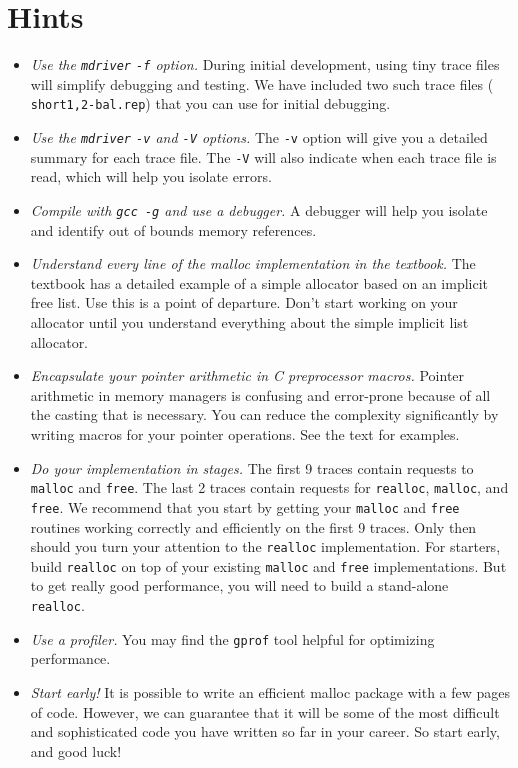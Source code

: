 \documentclass[11pt]{article}
\begin{document}
\section{Hints}
\begin{itemize}

\item {\em Use the {\tt mdriver} {\tt -f} option.}  During initial
development, using tiny trace files will simplify debugging and
testing. We have included two such trace files ({\tt
short{1,2}-bal.rep}) that you can use for initial debugging.

\item {\em Use the {\tt mdriver} {\tt -v} and {\tt -V} options.}  The
{\tt -v} option will give you a detailed summary for each trace file.
The {\tt -V} will also indicate when each trace file is read, which 
will help you isolate errors.

\item {\em Compile with {\tt gcc -g} and use a debugger.} A debugger
will help you isolate and identify out of bounds memory references.

\item {\em Understand every line of the malloc implementation in the
textbook.}  The textbook has a detailed example of a simple allocator
based on an implicit free list. Use this is a point of departure.
Don't start working on your allocator until you understand everything
about the simple implicit list allocator.

\item {\em Encapsulate your pointer arithmetic in C preprocessor
macros.}  Pointer arithmetic in memory managers is confusing and error-prone
because of all the casting that is necessary. You can reduce the
complexity significantly by writing macros for your pointer operations.
See the text for examples. 

\item {\em Do your implementation in stages.}  The first 9 traces
contain requests to {\tt malloc} and {\tt free}.  The last 2 traces
contain requests for {\tt realloc}, {\tt malloc}, and {\tt free}. We
recommend that you start by getting your {\tt malloc} and {\tt free}
routines working correctly and efficiently on the first 9 traces. Only
then should you turn your attention to the {\tt realloc}
implementation.  For starters, build {\tt realloc} on top of your
existing {\tt malloc} and {\tt free} implementations. But to get
really good performance, you will need to build a stand-alone {\tt
realloc}.

\item{\em Use a profiler.} You may find the {\tt gprof} tool helpful
for optimizing performance.

\item {\em Start early!} It is possible to write an efficient malloc
package with a few pages of code. However, we can guarantee that it
will be some of the most difficult and sophisticated code you have
written so far in your career. So start early, and good luck!

\end{itemize}
\end{document}
